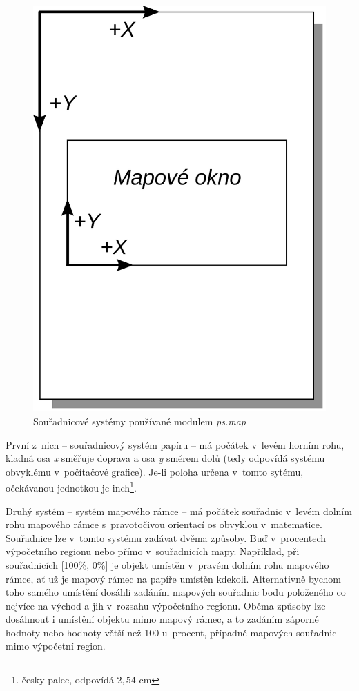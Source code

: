\documentclass[a4paper,12pt,draft]{article}
\newcommand{\modul}[1]{\emph{#1}}
\begin{document}
\begin{figure}[h!]
    \centering
    \includegraphics[width=0.2\textheight]{sour_systemy.pdf}
    \caption{Souřadnicové systémy používané modulem
    \modul{ps.map}\label{fig:sour_systemy}}
\end{figure}


První z~nich -- souřadnicový systém papíru -- má počátek v~levém
horním rohu, kladná osa \emph{x} směřuje doprava a osa \emph{y} směrem
dolů (tedy odpovídá systému obvyklému v~počítačové grafice).
Je-li poloha určena v~tomto sytému, očekávanou jednotkou je inch\footnote{
česky palec, odpovídá $2{,}54$ cm}.

Druhý systém -- systém mapového rámce -- má počátek souřadnic
v~levém dolním rohu mapového rámce s~pravotočivou orientací os obvyklou
v~matematice. Souřad\-nice lze v~tomto systému zadávat dvěma způsoby. Buď
v~procentech výpočetního regionu nebo přímo v~souřadnicích
mapy. Například, při souřadnicích [100\%, 0\%] je objekt umístěn
v~pravém dolním rohu mapového rámce, ať už je mapový rámec na papíře
umístěn kdekoli. Alternativně bychom toho samého umístění dosáhli
zadáním mapových souřadnic bodu položeného co nejvíce na východ
a jih v~rozsahu výpočet\-ního regionu. Oběma způsoby lze dosáhnout i
umístění objektu mimo mapový rámec, a to zadáním záporné hodnoty
nebo hodnoty větší než 100 u~procent, případně mapových souřadnic
mimo výpočetní region.
\end{document}
